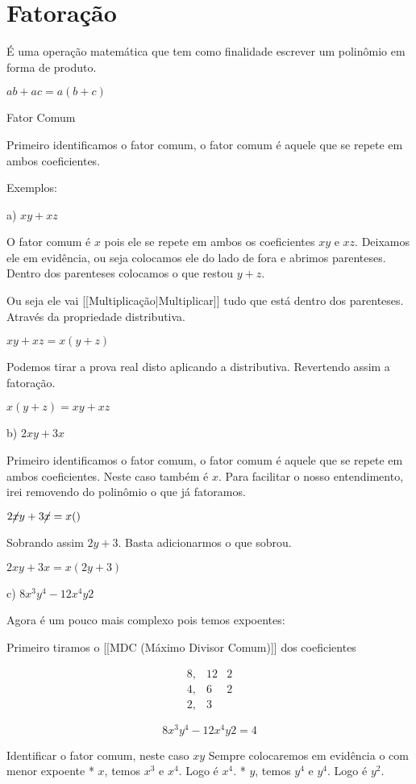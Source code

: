 \documentclass[letterpaper]{book}
\begin{document}
\section{Fatoração}

É uma operação matemática que tem como finalidade escrever um polinômio em forma de produto.

\(ab + ac = a(b + c)\)

Fator Comum

Primeiro identificamos o fator comum, o fator comum é aquele que se repete em ambos coeficientes.

Exemplos:

a) \(xy + xz\)

O fator comum é \(x\) pois ele se repete em ambos os coeficientes $xy$ e $xz$. Deixamos ele em evidência, ou seja colocamos ele do lado de fora e abrimos parenteses. Dentro dos parenteses colocamos o que restou $y + z$.

Ou seja ele vai [[Multiplicação|Multiplicar]] tudo que está dentro dos parenteses. Através da propriedade distributiva.

\(xy + xz = x(y + z)\)

Podemos tirar a prova real disto aplicando a distributiva. Revertendo assim a fatoração.

\(x(y + z) = xy + xz\)

b) \(2xy + 3x\)

Primeiro identificamos o fator comum, o fator comum é aquele que se repete em ambos coeficientes. Neste caso também é \(x\). Para facilitar o nosso entendimento, irei removendo do polinômio o que já fatoramos.

\(2\cancel xy + 3 \cancel x = x()\)

Sobrando assim \(2y + 3\). Basta adicionarmos o que sobrou.

\(2 xy + 3x = x(2y + 3)\)

c) \(8x^{3} y^{4} - 12x^{4}y{2}\) 

Agora é um pouco mais complexo pois temos expoentes:

Primeiro tiramos o [[MDC (Máximo Divisor Comum)]] dos coeficientes

\[
\begin{array}{cc|cc}
8, & 12 & 2 \\
4, & 6 & 2 \\ 
2, & 3
\end{array}
\]

\[8x^{3} y^{4} - 12x^{4}y{2} = 4\]

Identificar o fator comum, neste caso \(xy\)
Sempre colocaremos em evidência o com menor expoente 
 * \(x\), temos $x^{3}$ e $x^{4}$. Logo é $x^{4}$.
 * \(y\), temos $y^{4}$ e $y^{4}$. Logo é $y^{2}$.
\end{document}
